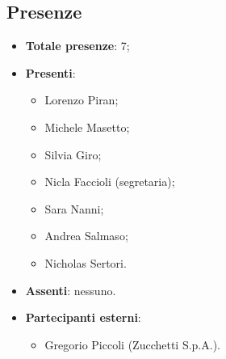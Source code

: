 \documentclass[11pt]{article}
\begin{document}
	\subsection{Presenze}
	\begin{itemize}
		\item \textbf{Totale presenze}: 7;
		\item \textbf{Presenti}:
		\begin{itemize}
			\item Lorenzo Piran; 
			\item Michele Masetto;
			\item Silvia Giro;
			\item Nicla Faccioli (segretaria);
			\item Sara Nanni;
			\item Andrea Salmaso;
			\item Nicholas Sertori.
		\end{itemize}
		\item \textbf{Assenti}: nessuno.
		\item \textbf{Partecipanti esterni}: 
			\begin{itemize}
				\item Gregorio Piccoli (Zucchetti S.p.A.).
			\end{itemize}
	\end{itemize}

	\newpage
\end{document}
